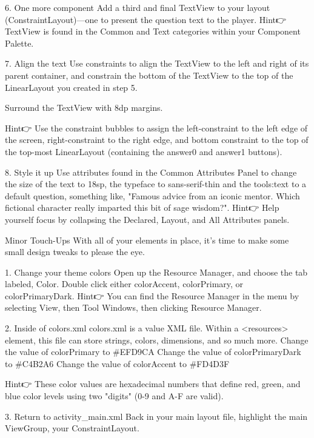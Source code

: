     6. One more component
        Add a third and final TextView to your layout (ConstraintLayout)—one to present the question text to the player.
        Hint👉 TextView is found in the Common and Text categories within your Component Palette.

    7. Align the text
        Use constraints to align the TextView to the left and right of its parent container, and constrain the bottom of the TextView to the top of the LinearLayout you created in step 5.

        Surround the TextView with 8dp margins.

        Hint👉 Use the constraint bubbles to assign the left-constraint to the left edge of the screen, right-constraint to the right edge, and bottom constraint to the top of the top-most LinearLayout (containing the answer0 and answer1 buttons).

    8. Style it up
        Use attributes found in the Common Attributes Panel to change the size of the text to 18sp, the typeface to sans-serif-thin and the tools:text to a default question, something like, "Famous advice from an iconic mentor. Which fictional character really imparted this bit of sage wisdom?".
        Hint👉 Help yourself focus by collapsing the Declared, Layout, and All Attributes panels.

Minor Touch-Ups
        With all of your elements in place, it’s time to make some small design tweaks to please the eye.

    1. Change your theme colors
        Open up the Resource Manager, and choose the tab labeled, Color. Double click either colorAccent, colorPrimary, or colorPrimaryDark.
        Hint👉 You can find the Resource Manager in the menu by selecting View, then Tool Windows, then clicking Resource Manager.

    2. Inside of colors.xml
        colors.xml is a value XML file. Within a <resources> element, this file can store strings, colors, dimensions, and so much more.
            Change the value of colorPrimary to #EFD9CA
            Change the value of colorPrimaryDark to #C4B2A6
            Change the value of colorAccent to #FD4D3F

        Hint👉 These color values are hexadecimal numbers that define red, green, and blue color levels using two "digits" (0-9 and A-F are valid).

    3. Return to activity_main.xml
        Back in your main layout file, highlight the main ViewGroup, your ConstraintLayout.


